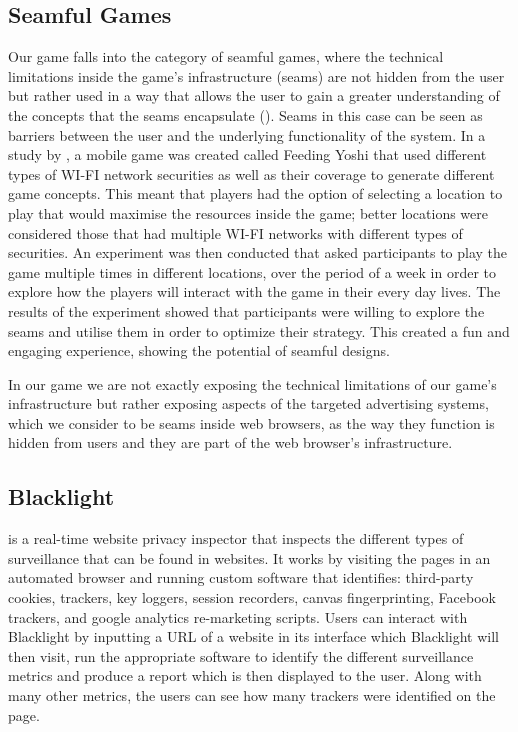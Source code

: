 \documentclass{l4proj}
\begin{document}
\subsection{Seamful Games}
Our game falls into the category of seamful games, where the technical limitations inside the game's infrastructure (seams) are not hidden from the user but rather used in a way that allows the user to gain a greater understanding of the concepts that the seams encapsulate (\cite{seams1}). Seams in this case can be seen as barriers between the user and the underlying functionality of the system. In a study by \cite{yoshi}, a mobile game was created called Feeding Yoshi that used different types of WI-FI network securities as well as their coverage to generate different game concepts. This meant that players had the option of selecting a location to play that would maximise the resources inside the game; better locations were considered those that had multiple WI-FI networks with different types of securities. An experiment was then conducted that asked participants to play the game multiple times in different locations, over the period of a week in order to explore how the players will interact with the game in their every day lives. The results of the experiment showed that participants were willing to explore the seams and utilise them in order to optimize their strategy. This created a fun and engaging experience, showing the potential of seamful designs.

In our game we are not exactly exposing the technical limitations of our game's infrastructure but rather exposing aspects of the targeted advertising systems, which we consider to be seams inside web browsers, as the way they function is hidden from users and they are part of the web browser's infrastructure.

\subsection{Blacklight}
\cite{blight} is a real-time website privacy inspector that inspects the different types of surveillance that can be found in websites. It works by visiting the pages in an automated browser and running custom software that identifies: third-party cookies, trackers, key loggers, session recorders, canvas fingerprinting, Facebook trackers, and google analytics re-marketing scripts. Users can interact with Blacklight by inputting a URL of a website in its interface which Blacklight will then visit, run the appropriate software to identify the different surveillance metrics and produce a report which is then displayed to the user. Along with many other metrics, the users can see how many trackers were identified on the page.
\end{document}
